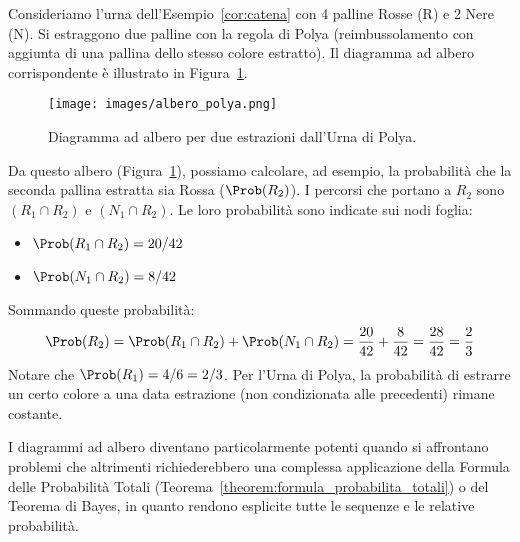 \begin{example}
Consideriamo l'urna dell'Esempio~\ref{cor:catena} con 4 palline Rosse (R) e 2 Nere (N). Si estraggono due palline con la regola di Polya (reimbussolamento con aggiunta di una pallina dello stesso colore estratto). Il diagramma ad albero corrispondente è illustrato in Figura~\ref{fig:albero_polya}.

\begin{figure}[H]
    \centering
    \texttt{[image: images/albero\_polya.png]} %
    \caption{Diagramma ad albero per due estrazioni dall'Urna di Polya.}
    \label{fig:albero_polya}
\end{figure}
Da questo albero (Figura~\ref{fig:albero_polya}), possiamo calcolare, ad esempio, la probabilità che la seconda pallina estratta sia Rossa ($\Prob(R_2)$). I percorsi che portano a $R_2$ sono $(R_1 \cap R_2)$ e $(N_1 \cap R_2)$. Le loro probabilità sono indicate sui nodi foglia:
\begin{itemize}
    \item $\Prob(R_1 \cap R_2) = 20/42$
    \item $\Prob(N_1 \cap R_2) = 8/42$
\end{itemize}
Sommando queste probabilità:
\[ \Prob(R_2) = \Prob(R_1 \cap R_2) + \Prob(N_1 \cap R_2) = \frac{20}{42} + \frac{8}{42} = \frac{28}{42} = \frac{2}{3} \]
Notare che $\Prob(R_1) = 4/6 = 2/3$. Per l'Urna di Polya, la probabilità di estrarre un certo colore a una data estrazione (non condizionata alle precedenti) rimane costante.
\end{example}

I diagrammi ad albero diventano particolarmente potenti quando si affrontano problemi che altrimenti richiederebbero una complessa applicazione della Formula delle Probabilità Totali (Teorema~\ref{theorem:formula_probabilita_totali}) o del Teorema di Bayes, in quanto rendono esplicite tutte le sequenze e le relative probabilità.

